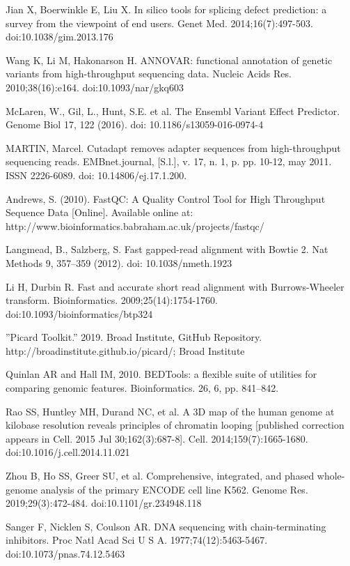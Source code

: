 \documentclass[a4paper,12pt]{article}
\begin{document}
\begin{thebibliography}{100}
Jian X, Boerwinkle E, Liu X. In silico tools for splicing defect prediction: a survey from the viewpoint of end users. Genet Med. 2014;16(7):497-503. doi:10.1038/gim.2013.176

Wang K, Li M, Hakonarson H. ANNOVAR: functional annotation of genetic variants from high-throughput sequencing data. Nucleic Acids Res. 2010;38(16):e164. doi:10.1093/nar/gkq603

McLaren, W., Gil, L., Hunt, S.E. et al. The Ensembl Variant Effect Predictor. Genome Biol 17, 122 (2016). doi: 10.1186/s13059-016-0974-4

MARTIN, Marcel. Cutadapt removes adapter sequences from high-throughput sequencing reads. EMBnet.journal, [S.l.], v. 17, n. 1, p. pp. 10-12, may 2011. ISSN 2226-6089. doi: 10.14806/ej.17.1.200. 

Andrews, S. (2010). FastQC:  A Quality Control Tool for High Throughput Sequence Data [Online]. Available online at: http://www.bioinformatics.babraham.ac.uk/projects/fastqc/

Langmead, B., Salzberg, S. Fast gapped-read alignment with Bowtie 2. Nat Methods 9, 357–359 (2012). doi: 10.1038/nmeth.1923

Li H, Durbin R. Fast and accurate short read alignment with Burrows-Wheeler transform. Bioinformatics. 2009;25(14):1754-1760. doi:10.1093/bioinformatics/btp324

''Picard Toolkit.'' 2019. Broad Institute, GitHub Repository. http://broadinstitute.github.io/picard/; Broad Institute

Quinlan AR and Hall IM, 2010. BEDTools: a flexible suite of utilities for comparing genomic features. Bioinformatics. 26, 6, pp. 841–842.

Rao SS, Huntley MH, Durand NC, et al. A 3D map of the human genome at kilobase resolution reveals principles of chromatin looping [published correction appears in Cell. 2015 Jul 30;162(3):687-8]. Cell. 2014;159(7):1665-1680. doi:10.1016/j.cell.2014.11.021

Zhou B, Ho SS, Greer SU, et al. Comprehensive, integrated, and phased whole-genome analysis of the primary ENCODE cell line K562. Genome Res. 2019;29(3):472-484. doi:10.1101/gr.234948.118

Sanger F, Nicklen S, Coulson AR. DNA sequencing with chain-terminating inhibitors. Proc Natl Acad Sci U S A. 1977;74(12):5463-5467. doi:10.1073/pnas.74.12.5463


\end{thebibliography}
\end{document}
